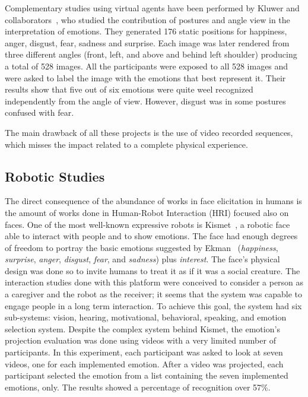 Complementary studies using virtual agents have been performed by  Kluwer and collaborators~\cite{Kluwer2004}, who studied the contribution of postures and angle view in the interpretation of emotions. They generated 176 static positions for happiness, anger, disgust, fear, sadness and surprise. Each image was later rendered from three different angles (front, left, and above and behind left shoulder) producing a total of 528 images. All the participants were exposed to all 528 images and were asked to label the image with the emotions that best represent it. Their results show that five out of six emotions were quite weel recognized independently from the angle of view. However, disgust was in some postures confused with fear.

The main drawback of all these projects is the use of video recorded sequences, which misses the impact related to a complete physical experience. 

\subsection{Robotic Studies}

The direct consequence of the abundance of works in face elicitation in humans is the amount of works done in Human-Robot Interaction (HRI) focused also on faces. One of the most well-known expressive robots is Kismet~\cite{Breazeal2002}, a robotic face able to interact with people and to show emotions. The face had enough degrees of freedom to portray the basic emotions suggested by Ekman~\cite{Ekman2004} (\textit{happiness}, \textit{surprise}, \textit{anger}, \textit{disgust}, \textit{fear}, and \textit{sadness}) plus \textit{interest}. The face's physical design was done so to invite humans to treat it as if it was a social creature. The interaction studies done with this platform were conceived to consider a person as a caregiver and the robot as the receiver; it seems that the system was capable to engage people in a long term interaction. To achieve this goal, the system had six sub-systems: vision, hearing, motivational, behavioral, speaking, and emotion selection system. Despite the complex system behind Kismet, the emotion's projection evaluation was done using videos with a very limited number of participants. In this experiment, each participant was asked to look at seven videos, one for each implemented emotion. After a video was projected, each participant selected the emotion from a list containing  the seven implemented emotions, only. The results showed a percentage of recognition over 57\%.

